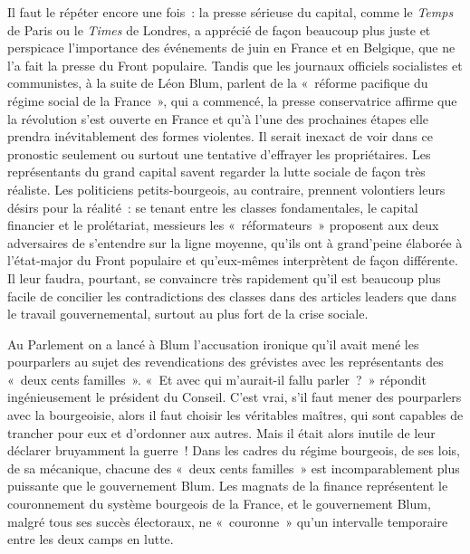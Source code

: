 \documentclass[french,twoside]{book} %
\begin{document}
\noindent Il faut le répéter encore une fois : la presse sérieuse du capital, comme le \emph{Temps} de Paris ou le \emph{Times} de Londres, a apprécié de façon beaucoup plus juste et perspicace l’importance des événements de juin en France et en Belgique, que ne l’a fait la presse du Front populaire. Tandis que les journaux officiels socialistes et communistes, à la suite de Léon Blum, parlent de la « réforme pacifique du régime social de la France », qui a commencé, la presse conservatrice affirme que la révolution s’est ouverte en France et qu’à l’une des prochaines étapes elle prendra inévitablement des formes violentes. Il serait inexact de voir dans ce pronostic seulement ou surtout une tentative d’effrayer les propriétaires. Les représentants du grand capital savent regarder la lutte sociale de façon très réaliste. Les politiciens petits-bourgeois, au contraire, prennent volontiers leurs désirs pour la réalité : se tenant entre les classes fondamentales, le capital financier et le prolétariat, messieurs les « réformateurs » proposent aux deux adversaires de s’entendre sur la ligne moyenne, qu’ils ont à grand’peine élaborée à l’état-major du Front populaire et qu’eux-mêmes interprètent de façon différente. Il leur faudra, pourtant, se convaincre très rapidement qu’il est beaucoup plus facile de concilier les contradictions des classes dans des articles leaders que dans le travail gouvernemental, surtout au plus fort de la crise sociale.\par
 Au Parlement on a lancé à Blum l’accusation ironique qu’il avait mené les pourparlers au sujet des revendications des grévistes avec les représentants des « deux cents familles ». « Et avec qui m’aurait-il fallu parler ? » répondit ingénieusement le président du Conseil. C’est vrai, s’il faut mener des pourparlers avec la bourgeoisie, alors il faut choisir les véritables maîtres, qui sont capables de trancher pour eux et d’ordonner aux autres. Mais il était alors inutile de leur déclarer bruyamment la guerre ! Dans les cadres du régime bourgeois, de ses lois, de sa mécanique, chacune des « deux cents familles » est incomparablement plus puissante que le gouvernement Blum. Les magnats de la finance représentent le couronnement du système bourgeois de la France, et le gouvernement Blum, malgré tous ses succès électoraux, ne « couronne » qu’un intervalle temporaire entre les deux camps en lutte.\par
\end{document}
